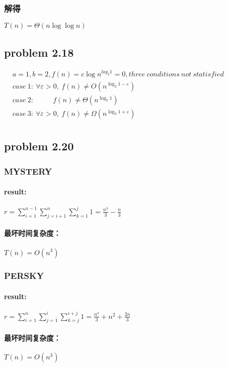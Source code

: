 \documentclass[11pt]{ctexart}
\begin{document}
	\subsubsection*{解得}
	$T(n)=\Theta(n\log\log n)$
	\subsection*{problem 2.18}
	$\begin{aligned}
	&a=1,b=2,f(n)=c\log n^{log_2 1}=0, three\ conditions\ not\ statisfied\\
	&case\ 1:\ \forall \varepsilon >0,\ f(n)\neq O(n^{\log_2 1-\varepsilon})\\
	&case\ 2:\ \ \ \ \ \ \ \ \ \ \ \ f(n)\neq\Theta(n^{\log_2 1})\\
	&case\ 3:\ \forall \varepsilon >0,\ f(n)\neq\Omega(n^{\log_2 1+\varepsilon})\\
	\end{aligned}
	$
	\newpage
	\subsection*{problem 2.20}
	\subsubsection*{MYSTERY}
	\paragraph{result:}
	$r= \sum_{i=1}^{n-1}\sum_{j=i+1}^{n}\sum_{k=1}^{j} 1=\frac{n^3}{3}-\frac{n}{3}$
	\paragraph{最坏时间复杂度：} $T(n)=O(n^3)$
	\subsubsection*{PERSKY}
	\paragraph{result:}
	$r= \sum_{i=1}^{n}\sum_{j=1}^{i}\sum_{k=j}^{i+j} 1=\frac{n^3}{3}+n^2+\frac{2n}{3}$
	\paragraph{最坏时间复杂度：} $T(n)=O(n^3)$
\end{document}
